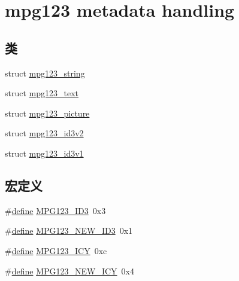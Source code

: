 \hypertarget{group__mpg123__metadata}{}\section{mpg123 metadata handling}
\label{group__mpg123__metadata}
\subsection*{类}
\begin{DoxyCompactItemize}
\item 
struct \hyperlink{structmpg123__string}{mpg123\+\_\+string}
\item 
struct \hyperlink{structmpg123__text}{mpg123\+\_\+text}
\item 
struct \hyperlink{structmpg123__picture}{mpg123\+\_\+picture}
\item 
struct \hyperlink{structmpg123__id3v2}{mpg123\+\_\+id3v2}
\item 
struct \hyperlink{structmpg123__id3v1}{mpg123\+\_\+id3v1}
\end{DoxyCompactItemize}
\subsection*{宏定义}
\begin{DoxyCompactItemize}
\item 
\#\hyperlink{structdefine}{define} \hyperlink{group__mpg123__metadata_gacee1d4e2cac4601f57eddadcc828f66c}{M\+P\+G123\+\_\+\+I\+D3}~0x3
\item 
\#\hyperlink{structdefine}{define} \hyperlink{group__mpg123__metadata_ga3fb42527b89f66d9caa6aee4fa6aaaae}{M\+P\+G123\+\_\+\+N\+E\+W\+\_\+\+I\+D3}~0x1
\item 
\#\hyperlink{structdefine}{define} \hyperlink{group__mpg123__metadata_ga8beaa04ade9db672e2bdf722c66b61ce}{M\+P\+G123\+\_\+\+I\+CY}~0xc
\item 
\#\hyperlink{structdefine}{define} \hyperlink{group__mpg123__metadata_ga25db33a48f531fd4da02dbf12d53e5be}{M\+P\+G123\+\_\+\+N\+E\+W\+\_\+\+I\+CY}~0x4
\end{DoxyCompactItemize}
